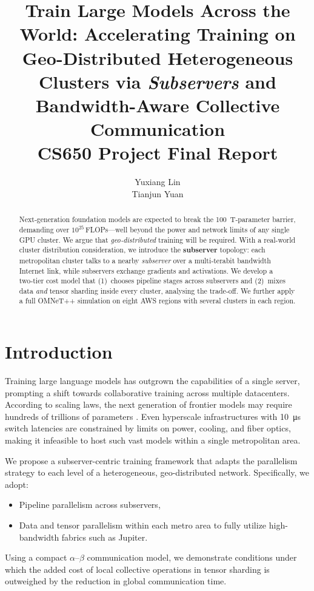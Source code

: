 \documentclass{article}
\title{
    \Large Train Large Models Across the World: Accelerating Training on Geo-Distributed Heterogeneous Clusters
    via \emph{Subservers} and Bandwidth-Aware Collective Communication\\[1em]
    \normalsize CS650 Project Final Report
}
\author{%
  Yuxiang Lin \\
  \And
  Tianjun Yuan \\
}
\begin{document}
\maketitle


\begin{abstract}
Next‑generation foundation models are expected to break the \SI{100}{T}‑parameter
barrier, demanding over $10^{25}$\,FLOPs—well beyond the power and network
limits of any single GPU cluster.
We argue that \emph{geo‑distributed} training will be required.
With a real-world cluster distribution consideration, we introduce the \textbf{subserver} topology:
each metropolitan cluster talks to a nearby \emph{subserver} over a
multi‑terabit bandwidth Internet link,  while subservers exchange
gradients and activations.
We develop a two‑tier cost model that
(1)~chooses pipeline stages across subservers and
(2)~mixes data \emph{and} tensor sharding inside every cluster,
analysing the trade‑off.
We further apply a full OMNeT++ simulation on eight AWS regions with several clusters in each region.
\end{abstract}

\section{Introduction}

Training large language models has outgrown the capabilities of a single server, prompting a shift towards collaborative training across multiple datacenters. According to scaling laws, the next generation of frontier models may require hundreds of trillions of parameters \cite{gherghescu2024look}. Even hyperscale infrastructures with \SI{10}{\micro\second} switch latencies are constrained by limits on power, cooling, and fiber optics, making it infeasible to host such vast models within a single metropolitan area.

We propose a subserver-centric training framework that adapts the parallelism strategy to each level of a heterogeneous, geo-distributed network. Specifically, we adopt:
\begin{itemize}
\item Pipeline parallelism across subservers,

\item Data and tensor parallelism within each metro area to fully utilize high-bandwidth fabrics such as Jupiter.
\end{itemize}

Using a compact $\alpha$–$\beta$ communication model, we demonstrate conditions under which the added cost of local collective operations in tensor sharding is outweighed by the reduction in global communication time.
\end{document}
